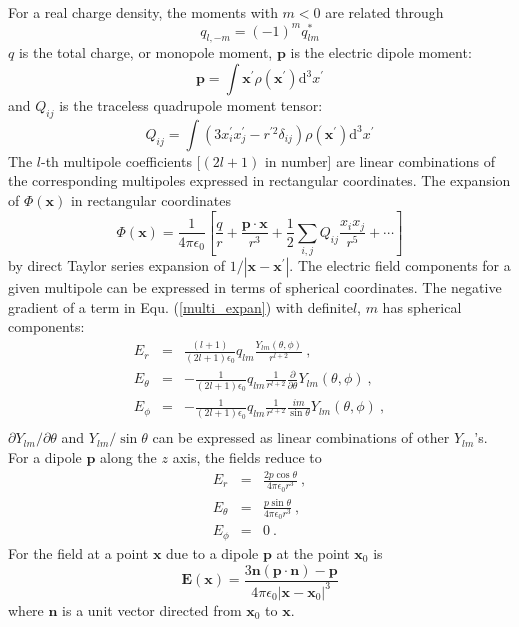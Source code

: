 \documentclass[12pt,a4paper]{article}
\renewcommand{\vec}[1]{\boldsymbol{#1}}
\newcommand{\dif}{\mathrm{d}}
\begin{document}
For a real charge density, the moments with $m < 0$ are related through
\begin{equation}
q_{l,-m} = (-1)^m q^\ast_{lm}
\end{equation}
$q$ is the total charge, or monopole moment, $\vec{p}$ is the electric dipole moment:
\begin{equation}
\vec{p} = \int \vec{x}^\prime \rho(\vec{x}^\prime) \dif^3 x^\prime
\end{equation}
and $Q_{ij}$ is the traceless quadrupole moment tensor:
\begin{equation}
Q_{ij} = \int (3x^\prime_i x^\prime_j - r^{\prime 2} \delta_{ij}) \rho(\vec{x}^\prime) \dif^3 x^\prime
\end{equation}
The $l$-th multipole coefficients [$(2l+1)$ in number] are linear combinations of the corresponding multipoles expressed in rectangular coordinates. The expansion of $\Phi(\vec{x})$ in rectangular coordinates
\begin{equation}
\Phi(\vec{x}) = \frac{1}{4\pi \epsilon_0}  \left[\frac{q}{r} +\frac{\vec{p}\cdot\vec{x}}{r^3} + \frac{1}{2} \sum_{i,j} Q_{ij} \frac{x_i x_j}{r^5} +\cdots \right]
\end{equation}
by direct Taylor series expansion of $1/|\vec{x} -\vec{x}^\prime|$. The electric field components for a given multipole can be expressed in terms of spherical coordinates. The negative gradient of a term in Equ. (\ref{multi_expan}) with definite$l$, $m$ has spherical components:
\begin{eqnarray*}
E_r &=& \frac{(l+1)}{(2l+1)\epsilon_0} q_{lm} \frac{Y_{lm}(\theta, \phi)}{r^{l+2}} ~, \\
E_\theta &=& -\frac{1}{(2l+1)\epsilon_0} q_{lm} \frac{1}{r^{l+2}} \frac{\partial}{\partial \theta} Y_{lm}(\theta, \phi)~, \\
E_\phi &=& -\frac{1}{(2l+1)\epsilon_0} q_{lm} \frac{1}{r^{l+2}} \frac{im}{\sin \theta} Y_{lm}(\theta, \phi) ~,\\
\end{eqnarray*}
$\partial Y_{lm}/\partial \theta$ and $Y_{lm}/\sin \theta$ can be expressed as linear combinations of other $Y_{lm}$'s. For a dipole $\vec{p}$ along the $z$ axis, the fields reduce to
\begin{eqnarray*}
E_r &=& \frac{2p\cos \theta}{4\pi \epsilon_0 r^3} ~, \\
E_\theta &=& \frac{p \sin \theta}{4\pi \epsilon_0 r^3} ~, \\
E_\phi &=& 0 ~.
\end{eqnarray*}
For the field at a point $\vec{x}$ due to a dipole $\vec{p}$ at the point $\vec{x}_0$ is 
\begin{equation}
\vec{E}(\vec{x}) = \frac{3\vec{n}(\vec{p}\cdot \vec{n}) -\vec{p}}{4\pi \epsilon_0 |\vec{x} -\vec{x}_0|^3}
\end{equation}
where $\vec{n}$ is a unit vector directed from $\vec{x}_0$ to $\vec{x}$. 
\end{document}
